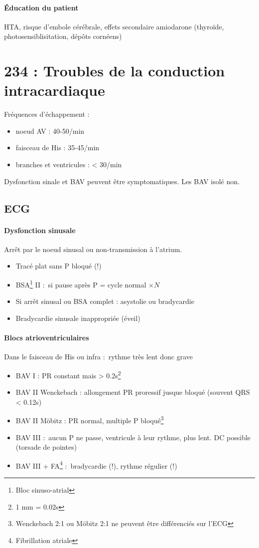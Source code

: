 \documentclass{article}
\begin{document}
\paragraph{Éducation du patient}
HTA, risque d'embole cérébrale, effets secondaire amiodarone (thyroïde,
photosensiblisitation, dépôts cornéens)






\section{234 : Troubles de la conduction intracardiaque}%
\label{sec:234_troubles_de_la_conduction_intracardiaque}
Fréquences d'échappement :
\begin{itemize}
  \item noeud AV : 40-50/min
  \item faisceau de His : 35-45/min
  \item branches et ventricules : < 30/min
\end{itemize}
Dysfonction sinale et BAV peuvent être symptomatiques. Les BAV isolé non.

\subsection{ECG}%
\paragraph{Dysfonction sinusale}
Arrêt par le noeud sinusal ou non-transmission à l'atrium.

\begin{itemize}
  \item Tracé plat sans P bloqué (!)
  \item BSA\footnote{Bloc sinuso-atrial} II : si pause après P = cycle normal $\times N$
  \item Si arrêt sinusal ou BSA complet : asystolie ou bradycardie
  \item Bradycardie sinusale inappropriée (éveil)
\end{itemize}

\paragraph{Blocs atrioventriculaires}
Dans le faisceau de His ou infra : rythme très lent donc grave \skull
\begin{itemize}
  \item BAV I : PR constant mais > 0.2s\footnote{1 mm = 0.02s}
  \item BAV II Wenckebach : allongement PR proressif jusque bloqué (souvent QRS
    < 0.12s)
  \item BAV II Möbitz : PR normal, multiple P bloqué\footnote{Wenckebach 2:1 ou
    Möbitz 2:1 ne peuvent être différenciés sur l'ECG}
  \item BAV III : aucun P ne passe, ventricule à leur rythme, plus lent.
    \danger{} DC possible (torsade de pointes)
  \item BAV III + FA\footnote{Fibrillation atriale} : bradycardie (!), rythme
    régulier (!)
\end{itemize}
\end{document}
